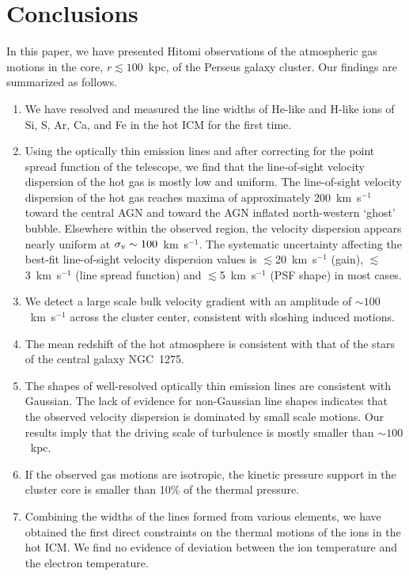 \section{Conclusions}
\label{sec:conclusions}

In this paper, we have presented Hitomi observations of the atmospheric gas motions in the core, $r\lesssim100$~kpc, of the Perseus galaxy cluster. Our findings are summarized as follows.

\begin{enumerate}
 \item We have resolved and measured the line widths of He-like and H-like ions of Si, S, Ar, Ca, and Fe in the hot ICM for the first time.

 \item Using the optically thin emission lines and after correcting for the point spread function of the telescope, we find that the line-of-sight velocity dispersion of the hot gas is mostly low and uniform. The line-of-sight velocity dispersion of the hot gas reaches maxima of approximately 200~km~s$^{-1}$ toward the central AGN and toward the AGN inflated north-western `ghost' bubble. Elsewhere within the observed region, the velocity dispersion appears nearly uniform at $\sigma_{\rm v} \sim 100$~km~s$^{-1}$. The systematic uncertainty affecting the best-fit line-of-sight velocity dispersion values is $\lesssim$20~km~s$^{-1}$ (gain), $\lesssim$3~km~s$^{-1}$ (line spread function) and $\lesssim$5~km~s$^{-1}$ (PSF shape) in most cases.

 \item We detect a large scale bulk velocity gradient with an amplitude of $\sim 100$~km~s$^{-1}$ across the cluster center, consistent with sloshing induced motions.

 \item The mean redshift of the hot atmosphere is consistent with that of the stars of the central galaxy NGC~1275.

 \item The shapes of well-resolved optically thin emission lines are consistent with Gaussian. The lack of evidence for non-Gaussian line shapes indicates that the observed velocity dispersion is dominated by small scale motions. Our results imply that the driving scale of turbulence is mostly smaller than $\sim100$~kpc.

 \item If the observed gas motions are isotropic, the kinetic pressure support in the cluster core is smaller than 10\% of the thermal pressure.

 \item Combining the widths of the lines formed from various elements, we have obtained the first direct constraints on the thermal motions of the ions in the hot ICM. We find no evidence of deviation between the ion temperature and the electron temperature.

\end{enumerate}

